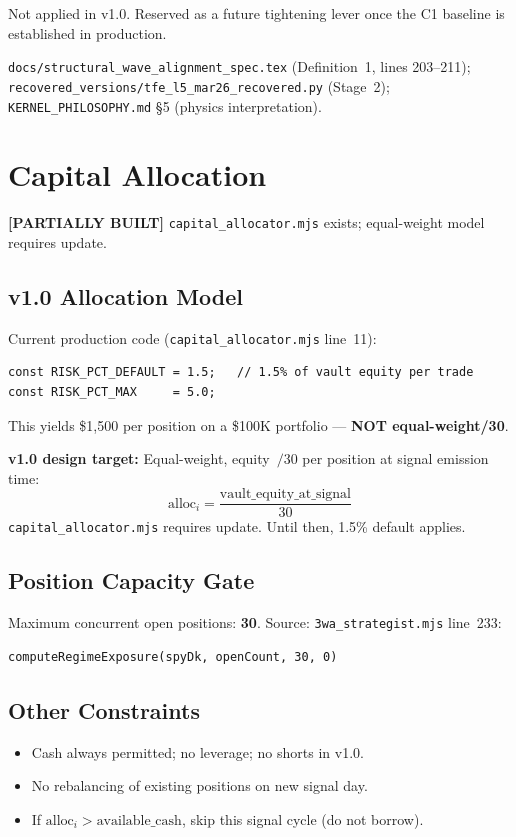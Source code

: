 \documentclass[11pt,a4paper]{article}
\newcommand{\statuspartial}{\textcolor{statuspartial}{\textbf{[PARTIALLY BUILT]}}}
\newcommand{\code}[1]{\texttt{\small#1}}
\begin{document}
Not applied in v1.0. Reserved as a future tightening lever once the C1 baseline is established in production.

\begin{sourcebox}
\texttt{docs/structural\_wave\_alignment\_spec.tex} (Definition~1, lines 203--211);
\texttt{recovered\_versions/tfe\_l5\_mar26\_recovered.py} (Stage~2);
\texttt{KERNEL\_PHILOSOPHY.md} §5 (physics interpretation).
\end{sourcebox}

\section{Capital Allocation}

\statuspartial{} \texttt{capital\_allocator.mjs} exists; equal-weight model requires update.

\subsection{v1.0 Allocation Model}

Current production code (\texttt{capital\_allocator.mjs} line~11):
\begin{lstlisting}[style=tfe-js]
const RISK_PCT_DEFAULT = 1.5;   // 1.5% of vault equity per trade
const RISK_PCT_MAX     = 5.0;
\end{lstlisting}

This yields \$1{,}500 per position on a \$100K portfolio — \textbf{NOT equal-weight/30}.

\textbf{v1.0 design target:} Equal-weight, equity~$/30$ per position at signal emission time:
\[
  \text{alloc}_i = \frac{\text{vault\_equity\_at\_signal}}{30}
\]
\code{capital\_allocator.mjs} requires update. Until then, 1.5\% default applies.

\subsection{Position Capacity Gate}

Maximum concurrent open positions: \textbf{30}.
Source: \texttt{3wa\_strategist.mjs} line~233:
\begin{lstlisting}[style=tfe-js]
computeRegimeExposure(spyDk, openCount, 30, 0)
\end{lstlisting}

\subsection{Other Constraints}
\begin{itemize}
  \item Cash always permitted; no leverage; no shorts in v1.0.
  \item No rebalancing of existing positions on new signal day.
  \item If $\text{alloc}_i > \text{available\_cash}$, skip this signal cycle (do not borrow).
\end{itemize}
\end{document}
